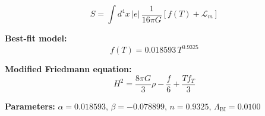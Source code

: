 
\begin{equation}
  S = \int d^4x \, |e| \, \frac{1}{16\pi G} \left[ f(T) + \mathcal{L}_m \right]
\end{equation}

\textbf{Best-fit model:}
\begin{equation}
  f(T) = 0.018593 \, T^{0.9325}
\end{equation}

\textbf{Modified Friedmann equation:}
\begin{equation}
  H^2 = \frac{8\pi G}{3} \rho - \frac{f}{6} + \frac{T f_T}{3}
\end{equation}

\textbf{Parameters:}
$\alpha = 0.018593$, \quad
$\beta = -0.078899$, \quad
$n = 0.9325$, \quad
$\Lambda_{\text{BI}} = 0.0100$